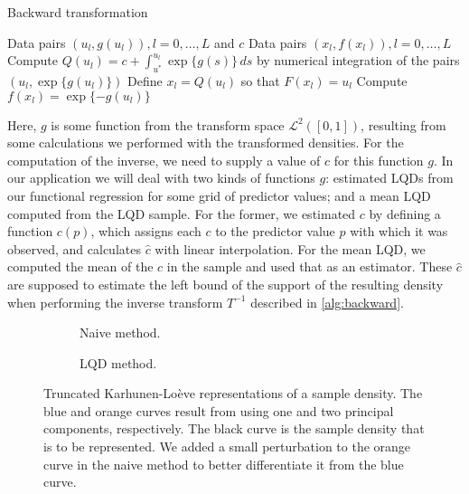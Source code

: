 \begin{algorithm}
    \caption{Backward transformation}
    \label{alg:backward}
    \begin{algorithmic}[1]
    \Require Data pairs \( (u_l, g(u_l)), l = 0, \ldots, L \) and \( c \)
    \Ensure Data pairs \( (x_l, f(x_l)), l = 0, \ldots, L \)
        \State Compute \( Q(u_l) = c + \int_{u^*}^{u_l} \exp\{g(s)\} \, ds \) by numerical integration of the pairs \( (u_l, \exp\{g(u_l)\}) \)
        \State Define \( x_l = Q(u_l) \) so that \( F(x_l) = u_l \)
        \State Compute \( f(x_l) = \exp \{-g(u_l)\} \)
    \EndFor
    \end{algorithmic}
\end{algorithm}

Here, $g$ is some function from the transform space $\mathcal{L}^2([0,1])$,
resulting from some calculations we performed with the transformed densities. For
the computation of the inverse, we need to supply a value of $c$ for this function $g$.
In our application we will deal with two kinds of functions $g$: estimated LQDs from
our functional regression for some grid of predictor values; and a mean LQD computed from
the LQD sample. For the former, we estimated $c$ by defining a function $c(p)$, which
assigns each $c$ to the predictor value $p$ with which it was observed, and calculates $\hat{c}$
with linear interpolation. For the mean LQD, we computed the mean of the $c$ in the sample
and used that as an estimator. These $\hat{c}$ are supposed to estimate the left bound
of the support of the resulting density when performing the inverse transform $T^{-1}$
described in \ref{alg:backward}.

\begin{figure}[h!]
    \centering
    \begin{subfigure}[b]{0.9\textwidth}
        \centering
        \resizebox{\linewidth}{!}{}
        \caption[Truncated representation --- naive]{Naive method.}
        \label{fig:naive_trunc_rep}
    \end{subfigure}
    \hfill %
    \begin{subfigure}[b]{0.9\textwidth}
        \centering
        \resizebox{\linewidth}{!}{}
        \caption[Truncated representation --- LQD method]{LQD method.}
        \label{fig:trunc_rep}
    \end{subfigure}
    \caption[Truncated Karhunen-Loève representations]{Truncated Karhunen-Loève
    representations of a sample density. The blue and orange curves result from using one
    and two principal components, respectively. The black curve is the sample density
    that is to be represented. We added a small perturbation to the orange curve in the
    naive method to better differentiate it from the blue curve.}
    \label{fig:trunc_reps}
\end{figure}

